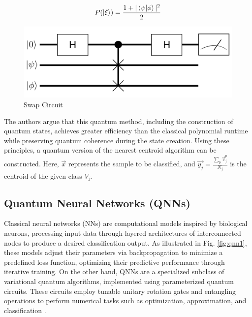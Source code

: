 \documentclass{article}
\begin{document}
\begin{equation}
    P(\ket{\xi}) = \frac{1 + |\braket{\psi | \phi}|^2}{2}
    \label{eq:3}
\end{equation}

\begin{figure}[ht]
  \centering
  \includegraphics[scale=0.15]{figures/swap.png}
  \caption{Swap Circuit}
  \label{fig:swap}
\end{figure}

The authors argue that this quantum method, including the construction of quantum states, achieves greater efficiency than the classical polynomial runtime while preserving quantum coherence during the state creation.
Using these principles, a quantum version of the nearest centroid algorithm can be constructed. Here, $\vec{x}$ represents the sample to be classified, and $\vec{y_j} = \frac{\sum_p \vec{v}^p_j}{N_j}$ is the centroid of the given class $V_j$. 


\subsection*{Quantum Neural Networks (QNNs)}
Classical neural networks (NNs) are computational models inspired by biological neurons, processing input data through layered architectures of interconnected nodes to produce a desired classification output. As illustrated in Fig. \ref{fig:qnn1}, these models adjust their parameters via backpropagation to minimize a predefined loss function, optimizing their predictive performance through iterative training. On the other hand, QNNs are a specialized subclass of variational quantum algorithms, implemented using parameterized quantum circuits. These circuits employ tunable unitary rotation gates and entangling operations to perform numerical tasks such as optimization, approximation, and classification \cite{kwak2021quantumneuralnetworksconcepts}.
\end{document}
